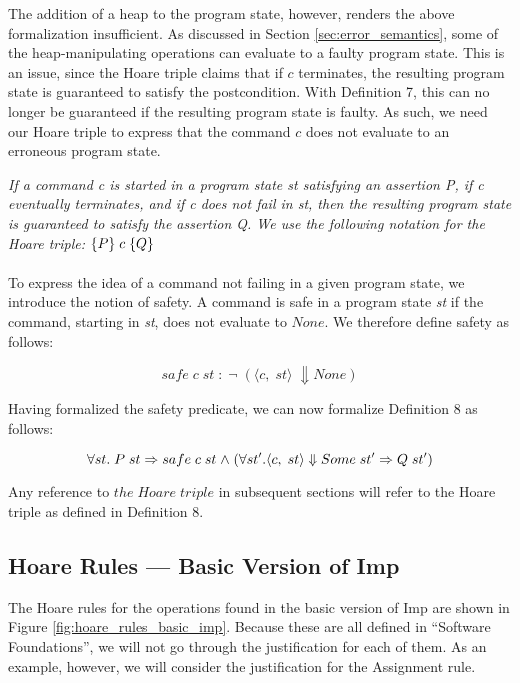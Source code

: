 The addition of a heap to the program state, however, renders the above formalization insufficient. As discussed in Section \ref{sec:error_semantics}, some of the heap-manipulating operations can evaluate to a faulty program state. This is an issue, since the Hoare triple claims that if $c$ terminates, the resulting program state is guaranteed to satisfy the postcondition. With Definition 7, this can no longer be guaranteed if the resulting program state is faulty. As such, we need our Hoare triple to express that the command $c$ does not evaluate to an erroneous program state.

 \textit{If a command c is started in a program state st satisfying an assertion P, if c eventually terminates, and if c does not fail in st, then the resulting program state is guaranteed to satisfy the assertion Q. We use the following notation for the Hoare triple: } $\{{P}\}{\;c\;}\{{Q}\}$

\paragraph{}
\label{sec:safety}
To express the idea of a command not failing in a given program state, we introduce the notion of safety. A command is safe in a program state {\it st} if the command, starting in {\it st}, does not evaluate to $None$. We therefore define safety as follows:

\[ \mathit{safe\;c\;st\;: \;\neg \;(\langle c,\;st\rangle\;\Downarrow None)}\]

Having formalized the safety predicate, we can now formalize Definition 8 as follows:

\[
\forall st.\; P\;st \Rightarrow safe\;c\;st \mathrel{\wedge} (\forall st'. \langle c,\;st\rangle\Downarrow Some\; st' \Rightarrow Q\;st')
\]

Any reference to $the\;Hoare\;triple$ in subsequent sections will refer to the Hoare triple as defined in Definition 8.

\subsection{Hoare Rules --- Basic Version of Imp}
The Hoare rules for the operations found in the basic version of Imp are shown in Figure \ref{fig:hoare_rules_basic_imp}. Because these are all defined in ``Software Foundations'', we will not go through the justification for each of them. As an example, however, we will consider the justification for the Assignment rule.

